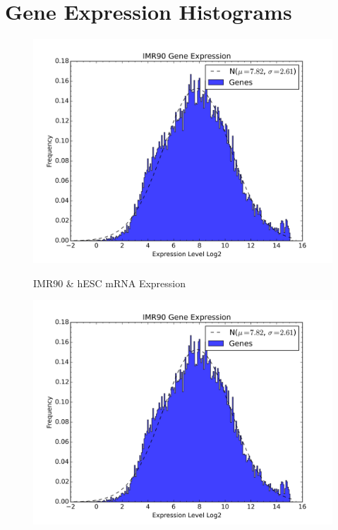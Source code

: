 \newpage
\section*{Gene Expression Histograms}

\begin{figure}[H]
  \caption{IMR90 \& hESC mRNA Expression}
  \centering
  \includegraphics[width=\textwidth]{./figures/supplementary/genes/IMR90-expr.png}\label{fig:190Expression}
\end{figure}

\begin{figure}[H]
  \centering
  \includegraphics[width=\textwidth]{./figures/supplementary/genes/IMR90-expr.png}\label{fig:h1expression}
\end{figure}

